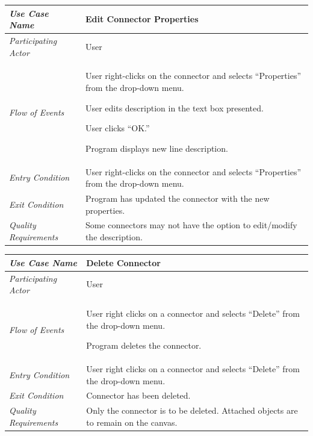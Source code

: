 \documentclass[twoside,letterpaper]{article}
\newenvironment{my_enumerate}{
\begin{enumerate}
  \setlength{\itemsep}{1pt}
  \setlength{\parskip}{0pt}
  \setlength{\parsep}{0pt}}{\end{enumerate}
}
\begin{document}
\begin{flushleft}
\tablehead{}
\begin{tabular}{|m{2.0in} m{5.0in}|}
\hline {\bfseries\emph{Use Case Name}}
& {\bfseries Edit Connector Properties}
\\\hline
\emph{Participating Actor}
& User
\\\hline
\emph{Flow of Events}
& 
\begin{my_enumerate}
\item User right-clicks on the connector and selects ``Properties'' from the drop-down menu.
\item User edits description in the text box presented.
\item User clicks ``OK.''
\item Program displays new line description.
\end{my_enumerate}
\\\hline
\emph{Entry Condition}
& User right-clicks on the connector and selects ``Properties'' from the drop-down menu.
\\\hline
\emph{Exit Condition}
& Program has updated the connector with the new properties.
\\\hline
\emph{Quality Requirements}
& Some connectors may not have the option to edit/modify the description.
\\\hline
\end{tabular}
\end{flushleft}
\bigskip


\begin{flushleft}
\tablehead{}
\begin{tabular}{|m{2.0in} m{5.0in}|}
\hline {\bfseries\emph{Use Case Name}}
& {\bfseries Delete Connector}
\\\hline
\emph{Participating Actor}
& User
\\\hline
\emph{Flow of Events}
& \begin{my_enumerate}
\item User right clicks on a connector and selects ``Delete'' from the drop-down menu.
\item Program deletes the connector.
\end{my_enumerate}
\\\hline
\emph{Entry Condition}
& User right clicks on a connector and selects ``Delete'' from the drop-down menu.
\\\hline
\emph{Exit Condition}
& Connector has been deleted.
\\\hline
\emph{Quality Requirements}
& Only the connector is to be deleted. Attached objects are to remain on the canvas.
\\\hline
\end{tabular}
\end{flushleft}
\bigskip
\end{document}
